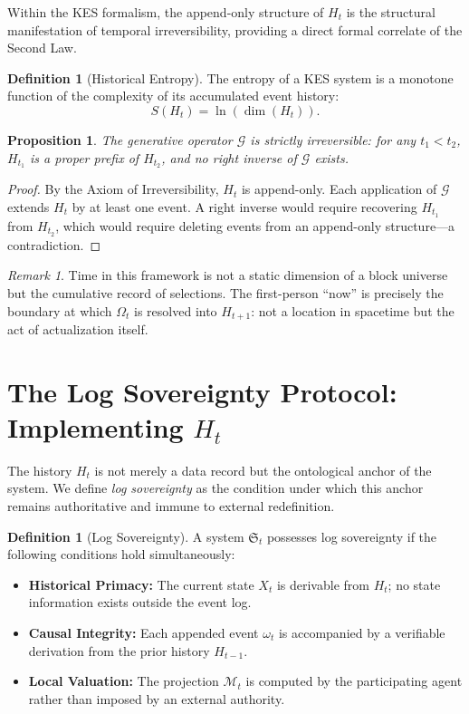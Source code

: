 \documentclass[11pt,a4paper]{article}
\newtheorem{proposition}[theorem]{Proposition}
\theoremstyle{definition}
\newtheorem{definition}[theorem]{Definition}
\theoremstyle{remark}
\newtheorem{remark}[theorem]{Remark}
\begin{document}
Within the KES formalism, the append-only structure of $H_t$ is the structural manifestation of temporal irreversibility, providing a direct formal correlate of the Second Law.

\begin{definition}[Historical Entropy]
The entropy of a KES system is a monotone function of the complexity of its accumulated event history:
\[
S(H_t) = \ln\!\left(\dim(H_t)\right).
\]
\end{definition}

\begin{proposition}
The generative operator $\mathcal{G}$ is strictly irreversible: for any $t_1 < t_2$, $H_{t_1}$ is a proper prefix of $H_{t_2}$, and no right inverse of $\mathcal{G}$ exists.
\end{proposition}

\begin{proof}
By the Axiom of Irreversibility, $H_t$ is append-only. Each application of $\mathcal{G}$ extends $H_t$ by at least one event. A right inverse would require recovering $H_{t_1}$ from $H_{t_2}$, which would require deleting events from an append-only structure---a contradiction.
\end{proof}

\begin{remark}
Time in this framework is not a static dimension of a block universe but the cumulative record of selections. The first-person ``now'' is precisely the boundary at which $\Omega_t$ is resolved into $H_{t+1}$: not a location in spacetime but the act of actualization itself.
\end{remark}

\section{The Log Sovereignty Protocol: Implementing $H_t$}

The history $H_t$ is not merely a data record but the ontological anchor of the system. We define \emph{log sovereignty} as the condition under which this anchor remains authoritative and immune to external redefinition.

\begin{definition}[Log Sovereignty]
A system $\mathfrak{S}_t$ possesses log sovereignty if the following conditions hold simultaneously:
\begin{itemize}
\item \textbf{Historical Primacy:} The current state $X_t$ is derivable from $H_t$; no state information exists outside the event log.
\item \textbf{Causal Integrity:} Each appended event $\omega_t$ is accompanied by a verifiable derivation from the prior history $H_{t-1}$.
\item \textbf{Local Valuation:} The projection $\mathcal{M}_t$ is computed by the participating agent rather than imposed by an external authority.
\end{itemize}
\end{definition}
\end{document}
